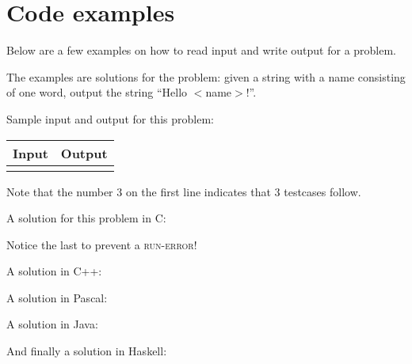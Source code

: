 \newpage
\appendix

\section{Code examples}\label{codeexamples}

Below are a few examples on how to read input and write output for a
problem.

The examples are solutions for the problem: given a string with a name
consisting of one word, output the string ``Hello $<$name$>$!''.

Sample input and output for this problem:

\begin{tabular}{|p{}|p{}|}
\hline
\textbf{Input} & \textbf{Output} \\
\hline
 &
 \\
\hline
\end{tabular}

Note that the number 3 on the first line indicates that 3 testcases
follow.

A solution for this problem in C:

Notice the last  to prevent a \textsc{run-error}!

\newpage

A solution in C++:

A solution in Pascal:

\newpage

A solution in Java:

And finally a solution in Haskell:


